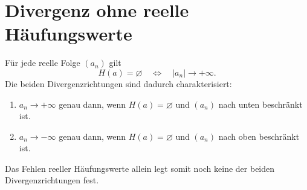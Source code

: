 \section{Divergenz ohne reelle Häufungswerte}

\begin{theorem}
\label{b21guide:thm:no-cluster}
Für jede reelle Folge $(a_n)$ gilt
\[
 H(a)=\varnothing\quad\Longleftrightarrow\quad |a_n|\to+\infty.
\]
Die beiden Divergenzrichtungen sind dadurch charakterisiert:
\begin{enumerate}
 \item $a_n\to+\infty$ genau dann, wenn $H(a)=\varnothing$
 und $(a_n)$ nach unten beschränkt ist.
 \item $a_n\to-\infty$ genau dann, wenn $H(a)=\varnothing$
 und $(a_n)$ nach oben beschränkt ist.
\end{enumerate}
Das Fehlen reeller Häufungswerte allein legt somit noch keine
der beiden Divergenzrichtungen fest.
\end{theorem}
